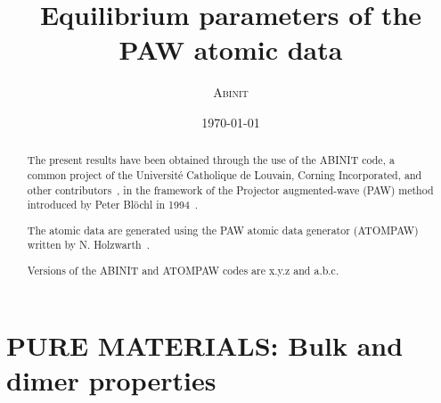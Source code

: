 \documentclass[onecolumn]{revtex4}
\begin{document}
\title{Equilibrium parameters of the PAW atomic data}
\date{\today}
\author{\textsc{Abinit}}
\begin{abstract}
The present results have been obtained through the use of the ABINIT code, 
a common project of the Universit\'e Catholique de Louvain, Corning
Incorporated, and other contributors~\cite{ABINIT,ABINITbis}, in the framework of the Projector augmented-wave (PAW)
method introduced by Peter Bl\"ochl in 1994~\cite{Blochl_PRB50_1994}. 


The atomic data are generated using the
PAW atomic data generator (ATOMPAW) written by N. Holzwarth~\cite{Holzwarth_PRB55_1997,Holzwarth_PRB57_1998,Tackett_CPC135_2001}.


Versions of the ABINIT and ATOMPAW codes are x.y.z and a.b.c.
\end{abstract}
\maketitle
\section{PURE MATERIALS: Bulk and dimer properties}
\newpage
\end{document}
